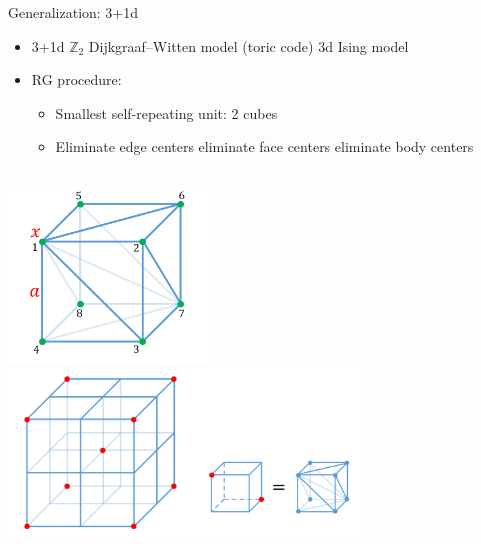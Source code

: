 \documentclass{fdubeamer}
\newcommand{\1}{\mathbb{1}}
\newcommand{\Z}{\mathbb{Z}}
\begin{document}
\begin{frame}{Generalization: 3+1d}

\begin{itemize}
  \item 3+1d $\Z_2$ Dijkgraaf--Witten model (toric code) \textrightarrow{} 3d Ising model
  \item RG procedure:

    \begin{itemize}
      \item Smallest self-repeating unit: 2 cubes
      \item Eliminate edge centers \textrightarrow{} eliminate face centers \textrightarrow{} eliminate body centers
    \end{itemize}
\end{itemize}

\begin{columns}[c]


    \centering
    \includegraphics[width=0.4\textwidth]{images/holographic/3+1d-cube-1.png} \\[1ex]
    \includegraphics[width=0.7\textwidth]{images/holographic/3+1d-cube-2.png}
    \vspace{-1em}



\end{columns}
\end{frame}
\end{document}
